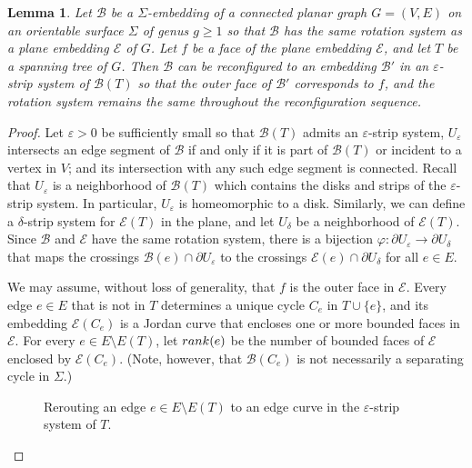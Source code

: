 \documentclass[10pt,a4paper]{amsart}
\newtheorem{lemma}{Lemma}
\begin{document}
\begin{lemma}\label{lem:hug-a-tree}
    Let $\mathcal{B}$ be a $\Sigma$-embedding of a connected planar graph $G = (V,E)$ on an orientable surface $\Sigma$ of genus $g\geq 1$ so that $\mathcal{B}$ has the same rotation system as a plane embedding $\mathcal{E}$ of $G$.
    Let $f$ be a face of the plane embedding $\mathcal{E}$, and let $T$ be a spanning tree of $G$.
    Then $\mathcal{B}$ can be reconfigured to an embedding $\mathcal{B}'$ in
    an $\varepsilon$-strip system of $\mathcal{B}(T)$ so that the outer face of $\mathcal{B}'$ corresponds to $f$, and the rotation system remains the same throughout the reconfiguration sequence.
\end{lemma}

\begin{proof}
    Let $\varepsilon>0$ be sufficiently small so that
    $\mathcal{B}(T)$ admits an $\varepsilon$-strip system, $U_\varepsilon$ intersects an edge segment of $\mathcal{B}$ if and only if it is part of $\mathcal{B}(T)$ or incident to a vertex in $V$; and its intersection with any such edge segment is connected.
    Recall that $U_\varepsilon$ is a neighborhood of $\mathcal{B}(T)$
    which contains the disks and strips of the $\varepsilon$-strip system.
    In particular, $U_\varepsilon$ is homeomorphic to a disk.
    Similarly, we can define a $\delta$-strip system for $\mathcal{E}(T)$ in the plane, and let $U_\delta$ be a neighborhood of $\mathcal{E}(T)$.
    Since $\mathcal{B}$ and $\mathcal{E}$ have the same rotation system, there is a bijection $\varphi:\partial U_\varepsilon\to \partial U_\delta$
    that maps the crossings $\mathcal{B}(e)\cap \partial U_\varepsilon$ to the crossings $\mathcal{E}(e)\cap \partial U_\delta$ for all $e\in E$.

    We may assume, without loss of generality, that $f$ is the outer face in $\mathcal{E}$. Every edge $e\in E$ that is not in $T$ determines a unique cycle $C_e$ in $T\cup\{e\}$, and its embedding $\mathcal{E}(C_e)$ is a Jordan curve that encloses one or more bounded faces in $\mathcal{E}$. For every $e\in E\setminus E(T)$, let ${\rm rank}(e)$ be the number of bounded faces of $\mathcal{E}$ enclosed by $\mathcal{E}(C_e)$. (Note, however, that $\mathcal{B}(C_e)$ is not necessarily a separating cycle in $\Sigma$.)


    \begin{figure}[htbp]
        \centering
        
        \caption{Rerouting an edge $e\in E\setminus E(T)$ to an edge curve in the $\varepsilon$-strip system of $T$.}
        \label{fig:hug-a-tree}
    \end{figure}


\end{proof}
\end{document}
